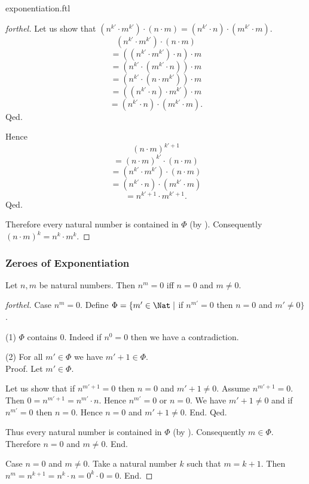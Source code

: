 \documentclass{naproche-library}
\begin{document}
\begin{smodule}{exponentiation.ftl}
\begin{proof}[forthel]
      Let us show that $(n^{k'} \cdot m^{k'}) \cdot (n \cdot m) = (n^{k'} \cdot n) \cdot (m^{k'} \cdot m)$.
        \[  (n^{k'} \cdot m^{k'}) \cdot (n \cdot m)       \]
        \[    = ((n^{k'} \cdot m^{k'}) \cdot n) \cdot m   \]
        \[    = (n^{k'} \cdot (m^{k'} \cdot n)) \cdot m   \]
        \[    = (n^{k'} \cdot (n \cdot m^{k'})) \cdot m   \]
        \[    = ((n^{k'} \cdot n) \cdot m^{k'}) \cdot m   \]
        \[    = (n^{k'} \cdot n) \cdot (m^{k'} \cdot m).  \]
      Qed.

      Hence
      \[  (n \cdot m)^{k' + 1}                          \]
      \[    = (n \cdot m)^{k'} \cdot (n \cdot m)        \]
      \[    = (n^{k'} \cdot m^{k'}) \cdot (n \cdot m)   \]
      \[    = (n^{k'} \cdot n) \cdot (m^{k'} \cdot m)   \]
      \[    = n^{k' + 1} \cdot m^{k' + 1}.              \]
    Qed.

    Therefore every natural number is contained in $\Phi$ (by ).
    Consequently $(n \cdot m)^{k} = n^{k} \cdot m^{k}$.
  \end{proof}


  \subsubsection*{Zeroes of Exponentiation}

  \begin{proposition}[forthel,id=ARITHMETIC_09_3860221447372800,printid]
    Let $n, m$ be natural numbers.
    Then $n^{m} = 0$ iff $n = 0$ and $m \neq 0$.
  \end{proposition}
  \begin{proof}[forthel]
    Case $n^{m} = 0$.
      Define $\Phi = \{ m' \in \Nat \mid$ if $n^{m'} = 0$ then $n = 0$ and $m' \neq 0 \}$.

      (1) $\Phi$ contains $0$.
      Indeed if $n^{0} = 0$ then we have a contradiction.

      (2) For all $m' \in \Phi$ we have $m' + 1 \in \Phi$. \\
      Proof.
        Let $m' \in \Phi$.

        Let us show that if $n^{m' + 1} = 0$ then $n = 0$ and $m' + 1 \neq 0$.
          Assume $n^{m' + 1} = 0$.
          Then $0 = n^{m' + 1} = n^{m'} \cdot n$.
          Hence $n^{m'} = 0$ or $n = 0$.
          We have $m' + 1 \neq 0$ and if $n^{m'} = 0$ then $n = 0$.
          Hence $n = 0$ and $m' + 1 \neq 0$.
        End.
      Qed.

      Thus every natural number is contained in $\Phi$ (by ).
      Consequently $m \in \Phi$.
      Therefore $n = 0$ and $m \neq 0$.
    End.

    Case $n = 0$ and $m \neq 0$.
      Take a natural number $k$ such that $m = k + 1$.
      Then $n^{m}
        = n^{k + 1}
        = n^{k} \cdot n
        = 0^{k} \cdot 0
        = 0$.
    End.
  \end{proof}
\end{smodule}
\end{document}

